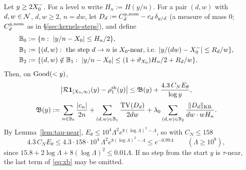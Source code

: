 \begin{lemma}\label{lem:xb}
Let $y\ge2X_0^{-}$. For a level $n$ write $H_n:=H(y/n)$. For a pair $(d,w)$ with $d,w\in\mathcal{N}$, $d,w\ge2$, $n=dw$, let
$D_d:=C_d^{y,\mathrm{nom}}-c_d\,\delta_{y/d}$ (a measure of mass $0$; $C^{y,\mathrm{nom}}_d$ as in \S\ref{sec:kernels-steps}), and define
\begin{align*}
  \mathbb B_0&:=\{n:\ |y/n-X_0|\le H_n/2\},\\
  \mathbb B_1&:=\{(d,w):\ \text{the step $d\to n$ is $X_0$-near, i.e. } |y/(dw)-X_0^{-}|\le R_d/w\},\\
  \mathbb B_2&:=\{(d,w)\notin\mathbb B_1:\ |y/n-X_0|\le(1+\vartheta_{X_0})H_n/2+R_d/w\}.
\end{align*}
Then, on $\mathrm{Good}(<y)$,
\begin{equation}\label{eq:xb}
  \bigl|\mathcal{R}\mathbf 1_{[X_0,\infty)}(y)-\rho^{\mathrm{sh}}_1(y)\bigr|\le\mathfrak{B}(y)+\frac{4.3\,C_N E_\theta}{\log y},
\end{equation}
\begin{equation}\label{eq:frakB}
  \mathfrak{B}(y):=\sum_{n\in\mathbb B_0}\frac{|c_n|}{2n}+\sum_{(d,w)\in\mathbb B_1}\frac{\operatorname{TV}(D_d)}{2dw}
  +\lambda_0\sum_{(d,w)\in\mathbb B_2}\frac{\lVert D_d\rVert_{\mathrm{KR}}}{dw\cdot wH_n}.
\end{equation}
By Lemma~\ref{lem:tau-near}, $E_\theta\le10^4\Lambda^2e^{8(\log\Lambda)^2-\Lambda}$, so with $C_N\le158$
\begin{equation}\label{eq:tau-term-bound}
  4.3\,C_NE_\theta\le4.3\cdot158\cdot10^4\,\Lambda^2e^{8(\log\Lambda)^2-\Lambda}\le e^{-0.99\Lambda}\qquad(\Lambda\ge10^8),
\end{equation}
since $15.8+2\log\Lambda+8(\log\Lambda)^2\le0.01\Lambda$. If no step from the start $y$ is
$\tau$-near, the last term of \eqref{eq:xb} may be omitted.
\end{lemma}

